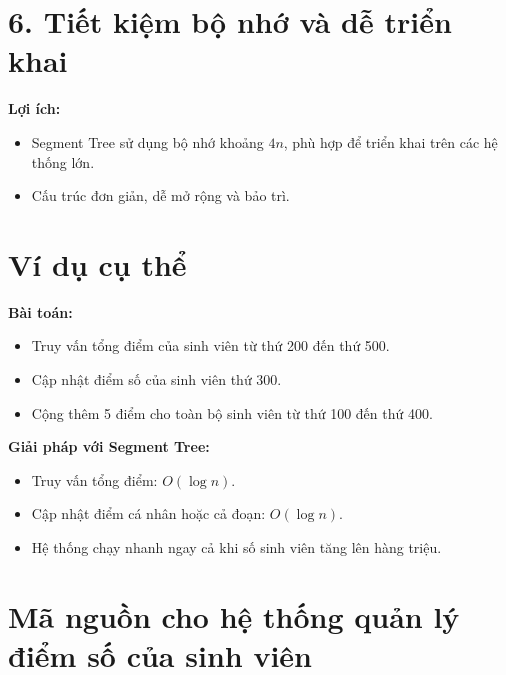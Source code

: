 \documentclass[a4paper]{article}
\begin{document}
\section*{6. Tiết kiệm bộ nhớ và dễ triển khai}
\hspace{0.5cm}\textbf{Lợi ích:}  
\begin{itemize}
    \item Segment Tree sử dụng bộ nhớ khoảng $4n$, phù hợp để triển khai trên các hệ thống lớn.  
    \item Cấu trúc đơn giản, dễ mở rộng và bảo trì.  
\end{itemize}

\section*{Ví dụ cụ thể}
\hspace{0.5cm}\textbf{Bài toán:}  
\begin{itemize}
    \item Truy vấn tổng điểm của sinh viên từ thứ 200 đến thứ 500.  
    \item Cập nhật điểm số của sinh viên thứ 300.  
    \item Cộng thêm 5 điểm cho toàn bộ sinh viên từ thứ 100 đến thứ 400.  
\end{itemize}

\textbf{Giải pháp với Segment Tree:}  
\begin{itemize}
    \item Truy vấn tổng điểm: $O(\log n)$.  
    \item Cập nhật điểm cá nhân hoặc cả đoạn: $O(\log n)$.  
    \item Hệ thống chạy nhanh ngay cả khi số sinh viên tăng lên hàng triệu.  
\end{itemize}
\pagebreak
\section{Mã nguồn cho hệ thống quản lý điểm số của sinh viên}
\end{document}
